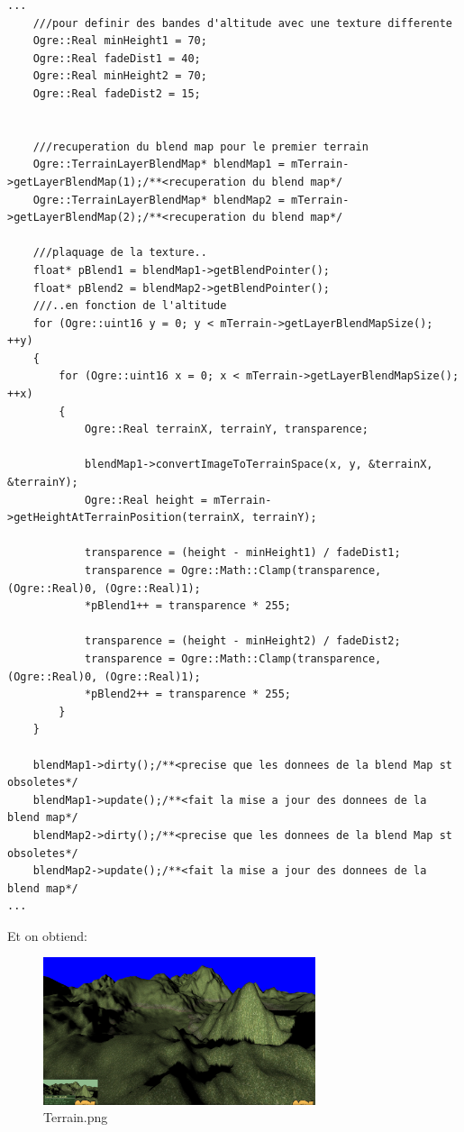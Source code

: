 \begin{lstlisting}[caption={Plaquage de textures sur zone}]
...
    ///pour definir des bandes d'altitude avec une texture differente
    Ogre::Real minHeight1 = 70;
    Ogre::Real fadeDist1 = 40;
    Ogre::Real minHeight2 = 70;
    Ogre::Real fadeDist2 = 15;
    
    
    ///recuperation du blend map pour le premier terrain
    Ogre::TerrainLayerBlendMap* blendMap1 = mTerrain->getLayerBlendMap(1);/**<recuperation du blend map*/
    Ogre::TerrainLayerBlendMap* blendMap2 = mTerrain->getLayerBlendMap(2);/**<recuperation du blend map*/
    
    ///plaquage de la texture..
    float* pBlend1 = blendMap1->getBlendPointer();
    float* pBlend2 = blendMap2->getBlendPointer();
    ///..en fonction de l'altitude
    for (Ogre::uint16 y = 0; y < mTerrain->getLayerBlendMapSize(); ++y)
    {
        for (Ogre::uint16 x = 0; x < mTerrain->getLayerBlendMapSize(); ++x)
        {
            Ogre::Real terrainX, terrainY, transparence;
            
            blendMap1->convertImageToTerrainSpace(x, y, &terrainX, &terrainY);
            Ogre::Real height = mTerrain->getHeightAtTerrainPosition(terrainX, terrainY);
            
            transparence = (height - minHeight1) / fadeDist1;
            transparence = Ogre::Math::Clamp(transparence, (Ogre::Real)0, (Ogre::Real)1);
            *pBlend1++ = transparence * 255;
            
            transparence = (height - minHeight2) / fadeDist2;
            transparence = Ogre::Math::Clamp(transparence, (Ogre::Real)0, (Ogre::Real)1);
            *pBlend2++ = transparence * 255;
        }
    }
    
    blendMap1->dirty();/**<precise que les donnees de la blend Map st obsoletes*/
    blendMap1->update();/**<fait la mise a jour des donnees de la blend map*/
    blendMap2->dirty();/**<precise que les donnees de la blend Map st obsoletes*/
    blendMap2->update();/**<fait la mise a jour des donnees de la blend map*/ 
...
\end{lstlisting}



Et on obtiend:
\begin{figure}[hbtp]
\caption{Terrain.png}
\centering
\includegraphics[width=8cm]{Ogre/1_Base_de_Ogre/5_Garder_les_pieds_sur_terre/images/Differentes_textures_selon_altitude2.png} %
\end{figure}








